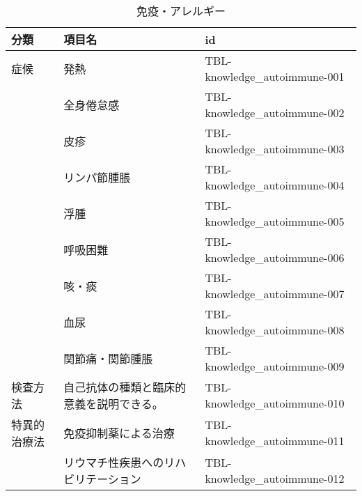 \begin{xltabular}{\linewidth}{XXX}
\caption{\label{tbl:knowledge_autoimmune}免疫・アレルギー} \\
\toprule
分類 & 項目名 & id \\
\midrule
\endhead
症候 & 発熱 & TBL-knowledge_autoimmune-001 \\
 & 全身倦怠感 & TBL-knowledge_autoimmune-002 \\
 & 皮疹 & TBL-knowledge_autoimmune-003 \\
 & リンパ節腫脹 & TBL-knowledge_autoimmune-004 \\
 & 浮腫 & TBL-knowledge_autoimmune-005 \\
 & 呼吸困難 & TBL-knowledge_autoimmune-006 \\
 & 咳・痰 & TBL-knowledge_autoimmune-007 \\
 & 血尿 & TBL-knowledge_autoimmune-008 \\
 & 関節痛・関節腫脹 & TBL-knowledge_autoimmune-009 \\
検査方法 & 自己抗体の種類と臨床的意義を説明できる。 & TBL-knowledge_autoimmune-010 \\
特異的治療法 & 免疫抑制薬による治療 & TBL-knowledge_autoimmune-011 \\
 & リウマチ性疾患へのリハビリテーション & TBL-knowledge_autoimmune-012 \\
\bottomrule
\end{xltabular}


